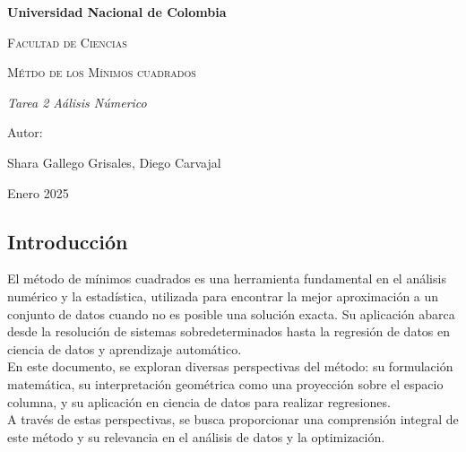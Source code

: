 \documentclass[12pt]{article}
\begin{document}
\begin{titlepage}
\centering
{\bfseries\LARGE Universidad Nacional de Colombia \par}
\vspace{1cm}
{\scshape\Large Facultad de Ciencias \par}
\vspace{3cm}
{\scshape\Huge M\'etdo de los M\'inimos cuadrados\par}
\vspace{3cm}
{\itshape\Large Tarea 2 
A\'alisis N\'umerico\par}
\vfill
{\Large Autor: \par}
{\Large Shara Gallego Grisales, Diego Carvajal \par}
\vfill
{\Large Enero 2025 \par}
\end{titlepage}

\tableofcontents
\vspace{25.0cm}

\begin{center}
\section{Introducci\'on}
\end{center}

\vspace{0.5cm }

El m\'etodo de m\'inimos cuadrados es una herramienta fundamental en el an\'alisis num\'erico y la estad\'istica, utilizada para encontrar la mejor aproximaci\'on a un conjunto de datos cuando no es posible una soluci\'on exacta. Su aplicación abarca desde la resolución de sistemas sobredeterminados hasta la regresi\'on de datos en ciencia de datos y aprendizaje autom\'atico. \\ 

En este documento, se exploran diversas perspectivas del m\'etodo: su formulaci\'on matem\'atica, su interpretaci\'on geom\'etrica como una proyecci\'on sobre el espacio columna, y su aplicaci\'on en ciencia de datos para realizar regresiones.\\

A trav\'es de estas perspectivas, se busca proporcionar una comprensi\'on integral de este m\'etodo y su relevancia en el an\'alisis de datos y la optimizaci\'on.\\
 
\vspace{0.5cm}
\end{document}
